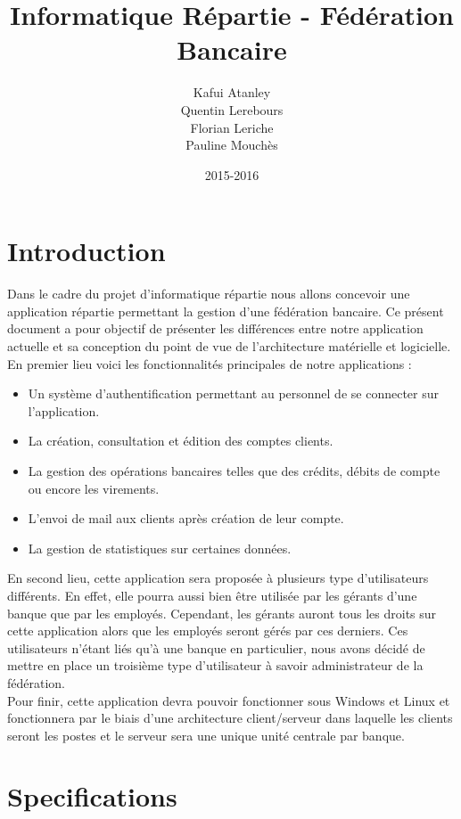 \documentclass[a4paper,10pt]{report}
\title{Informatique Répartie - Fédération Bancaire}
\date{2015-2016}
\author{Kafui Atanley \\ Quentin Lerebours \\ Florian Leriche \\ Pauline Mouchès}
\begin{document}
\maketitle
\tableofcontents
\chapter{Introduction}

    

	Dans le cadre du projet d'informatique répartie nous allons concevoir une application répartie permettant la gestion d'une fédération bancaire. Ce présent document a pour objectif de présenter les différences entre notre application actuelle et sa conception du point de vue de l'architecture matérielle et logicielle.
En premier lieu voici les fonctionnalités principales de notre applications :
	\begin{itemize}
		\item Un système d'authentification permettant au personnel de se connecter sur l'application.
		\item La création, consultation et édition des comptes clients.
		\item La gestion des opérations bancaires telles que des crédits, débits de compte ou encore les virements.
		\item L'envoi de mail aux clients après création de leur compte.
		\item La gestion de statistiques sur certaines données.
		\end{itemize}
En second lieu, cette application sera proposée à plusieurs type d'utilisateurs différents. En effet, elle pourra aussi bien être utilisée par les gérants d'une banque que par les employés. Cependant, les gérants auront tous les droits sur cette application alors que les employés seront gérés par ces derniers. Ces utilisateurs n'étant liés qu'à une banque en particulier, nous avons décidé de mettre en place un troisième type d'utilisateur à savoir administrateur de la fédération. \\
	Pour finir, cette application devra pouvoir fonctionner sous Windows et Linux et fonctionnera par le biais d'une architecture client/serveur dans laquelle les clients seront les postes et le serveur sera une unique unité centrale par banque.

\chapter{Specifications}
\end{document}
